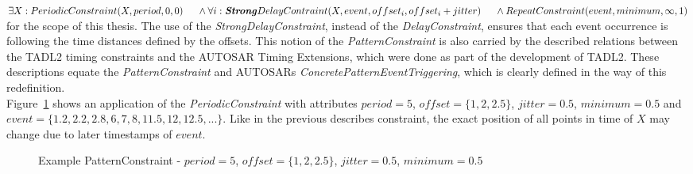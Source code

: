 		\begin{math}
			\exists X: PeriodicConstraint(X, period, 0, 0)\\
			\text{\hspace{.5cm}} \land \forall i: \textbf{\emph{Strong}}DelayContraint(X, event, offset_i, offset_i+jitter)\\
			\text{\hspace{.5cm}} \land RepeatConstraint(event, minimum, \infty, 1)
		\end{math}\\[10pt]
		for the scope of this thesis. The use of the \emph{StrongDelayConstraint}, instead of the \emph{DelayConstraint}, ensures that each event occurrence is following the time distances defined by the offsets. This notion of the \emph{PatternConstraint} is also carried by the described relations between the TADL2 timing constraints and the AUTOSAR Timing Extensions, which were done as part of the development of TADL2. These descriptions equate the \emph{PatternConstraint} and AUTOSARs \emph{ConcretePatternEventTriggering}, which is clearly defined in the way of this redefinition.\\
		Figure~\ref{fig:PatternConstraintExample} shows an application of the \emph{PeriodicConstraint} with attributes $period=5$, $offset=\{1, 2, 2.5\}$, $jitter=0.5$, $minimum=0.5$ and\\
		$event = \{1.2, 2.2, 2.8, 6, 7, 8, 11.5, 12, 12.5, ...\}$. Like in the previous describes constraint, the exact position of all points in time of $X$ may change due to later timestamps of $event$.
		\begin{figure}
			\caption{Example PatternConstraint - $period=5$, $offset=\{1, 2, 2.5\}$, $jitter=0.5$, $minimum=0.5$}
			\label{fig:PatternConstraintExample}
		\end{figure}
		
